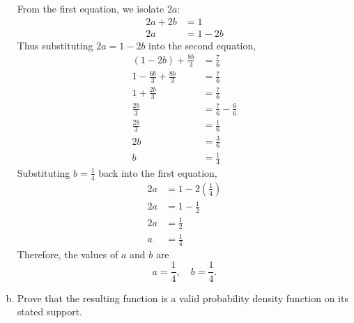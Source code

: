 \documentclass[letterpaper,12pt]{article}
\begin{document}
\begin{enumerate}[(a)]
\begin{list}{}{}
        From the first equation, we isolate $2a$:
        \begin{align*}
        2a + 2b &= 1 \\
        2a &= 1 - 2b
        \end{align*}
        Thus substituting $2a = 1 - 2b$ into the second equation, 
        \begin{align*}
        (1 - 2b) + \frac{8b}{3} &= \frac{7}{6} \\
        1 - \frac{6b}{3} + \frac{8b}{3} &= \frac{7}{6} \\
        1 + \frac{2b}{3} &= \frac{7}{6} \\
        \frac{2b}{3} &= \frac{7}{6} - \frac{6}{6} \\
        \frac{2b}{3} &= \frac{1}{6} \\
        2b &= \frac{3}{6} \\
        b &= \frac{1}{4}
        \end{align*}
        Substituting $b = \frac{1}{4}$ back into the first equation,
        \begin{align*}
        2a &= 1 - 2\left(\frac{1}{4}\right) \\
        2a &= 1 - \frac{1}{2} \\
        2a &= \frac{1}{2} \\
        a &= \frac{1}{4}
        \end{align*}
        Therefore, the values of $a$ and $b$ are
        \[        \boxed{ a = \frac{1}{4}, \quad b = \frac{1}{4}.}\]
    \end{list}
    \item Prove that the resulting function is a valid probability density function on its stated support.
    \vspace{0.5em}
\end{enumerate}
\end{document}

